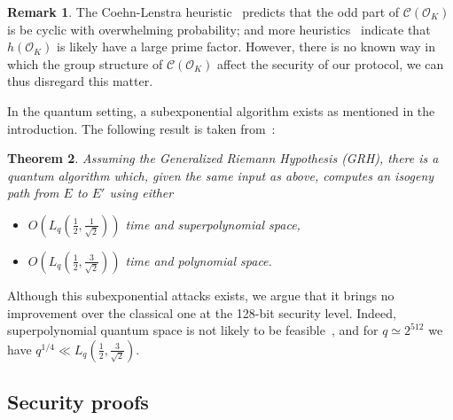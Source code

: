 \documentclass{article}
\newcommand{\Cl}{\mathcal{C}}
\renewcommand{\O}{\mathcal{O}}
\newtheorem{theorem}{Theorem}[section]
\theoremstyle{definition}
\newtheorem{remark}[theorem]{Remark}
\begin{document}
\begin{remark}
  The Coehn-Lenstra heuristic~\cite{10.1007/BFb0099440} predicts that
  the odd part of $\Cl(\O_K)$ is be cyclic with overwhelming
  probability; and more heuristics~\cite{10.1007/3-540-44448-3_18}
  indicate that $h(\O_K)$ is likely have a large prime factor.
  However, there is no known way in which the group structure of
  $\Cl(\O_K)$ affect the security of our protocol, we can thus
  disregard this matter.
\end{remark}

In the quantum setting, a subexponential algorithm exists as mentioned
in the introduction. The following result is taken
from~\cite{childs2014constructing}:

\begin{theorem}
Assuming the Generalized Riemann Hypothesis (GRH), there is
a quantum algorithm which, given the same input as above,
computes an isogeny path from $E$ to $E'$ using either
\begin{itemize}
\item $O(L_q(\frac{1}{2},\frac{1}{\sqrt{2}}))$ time and
superpolynomial space,
\item $O(L_q(\frac{1}{2},\frac{3}{\sqrt{2}}))$ time and
polynomial space.
\end{itemize}
\end{theorem}

Although this subexponential attacks exists, we argue that it brings
no improvement over the classical one at the 128-bit security
level. Indeed, superpolynomial quantum space is not likely to be
feasible~\cite{todo:qubits}, and for $q\simeq 2^{512}$ we have
$q^{1/4} \ll L_q(\frac{1}{2}, \frac{3}{\sqrt{2}}).$

\subsection{Security proofs}
\label{sec:proofs}



\end{document}
